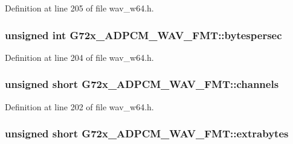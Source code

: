 Definition at line 205 of file wav\+\_\+w64.\+h.

\subsubsection[{\texorpdfstring{bytespersec}{bytespersec}}]{\setlength{\rightskip}{0pt plus 5cm}unsigned {\bf int} G72x\+\_\+\+A\+D\+P\+C\+M\+\_\+\+W\+A\+V\+\_\+\+F\+M\+T\+::bytespersec}\hypertarget{struct_g72x___a_d_p_c_m___w_a_v___f_m_t_a54de4421ecc11371cef9cd696ee7a6a4}{}\label{struct_g72x___a_d_p_c_m___w_a_v___f_m_t_a54de4421ecc11371cef9cd696ee7a6a4}


Definition at line 204 of file wav\+\_\+w64.\+h.

\subsubsection[{\texorpdfstring{channels}{channels}}]{\setlength{\rightskip}{0pt plus 5cm}unsigned short G72x\+\_\+\+A\+D\+P\+C\+M\+\_\+\+W\+A\+V\+\_\+\+F\+M\+T\+::channels}\hypertarget{struct_g72x___a_d_p_c_m___w_a_v___f_m_t_a250906710575f015facc68fd95d3c369}{}\label{struct_g72x___a_d_p_c_m___w_a_v___f_m_t_a250906710575f015facc68fd95d3c369}


Definition at line 202 of file wav\+\_\+w64.\+h.

\subsubsection[{\texorpdfstring{extrabytes}{extrabytes}}]{\setlength{\rightskip}{0pt plus 5cm}unsigned short G72x\+\_\+\+A\+D\+P\+C\+M\+\_\+\+W\+A\+V\+\_\+\+F\+M\+T\+::extrabytes}\hypertarget{struct_g72x___a_d_p_c_m___w_a_v___f_m_t_a70c544b09803f37545eaf9f22fbe642f}{}\label{struct_g72x___a_d_p_c_m___w_a_v___f_m_t_a70c544b09803f37545eaf9f22fbe642f}


